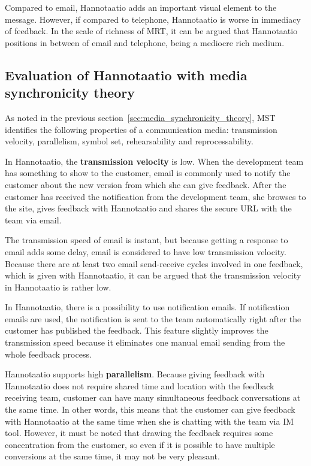 \documentclass[english,12pt,a4paper,pdftex]{article}
\begin{document}
Compared to email, Hannotaatio adds an important visual element to the message. However, if compared to telephone, Hannotaatio is worse in immediacy of feedback. In the scale of richness of \ac{MRT}, it can be argued that Hannotaatio positions in between of email and telephone, being a mediocre rich medium.

\subsection{Evaluation of Hannotaatio with media synchronicity theory}

As noted in the previous section~\ref{sec:media_synchronicity_theory}, \ac{MST} identifies the following properties of a communication media: transmission velocity, parallelism, symbol set, rehearsability and reprocessability.

In Hannotaatio, the \textbf{transmission velocity} is low. When the development team has something to show to the customer, email is commonly used to notify the customer about the new version from which she can give feedback. After the customer has received the notification from the development team, she browses to the site, gives feedback with Hannotaatio and shares the secure \ac{URL} with the team via email.

The transmission speed of email is instant, but because getting a response to email adds some delay, email is considered to have low transmission velocity. Because there are at least two email send-receive cycles involved in one feedback, which is given with Hannotaatio, it can be argued that the transmission velocity in Hannotaatio is rather low.

In Hannotaatio, there is a possibility to use notification emails. If notification emails are used, the notification is sent to the team automatically right after the customer has published the feedback. This feature slightly improves the transmission speed because it eliminates one manual email sending from the whole feedback process.

Hannotaatio supports high \textbf{parallelism}. Because giving feedback with Hannotaatio does not require shared time and location with the feedback receiving team, customer can have many simultaneous feedback conversations at the same time. In other words, this means that the customer can give feedback with Hannotaatio at the same time when she is chatting with the team via \ac{IM} tool. However, it must be noted that drawing the feedback requires some concentration from the customer, so even if it is possible to have multiple conversions at the same time, it may not be very pleasant.
\end{document}
